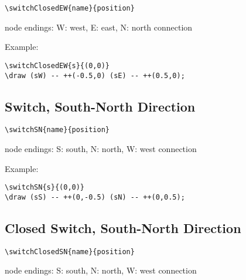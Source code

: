\documentclass[parskip=full]{scrartcl}
\begin{document}
\begin{verbatim}
\switchClosedEW{name}{position}
\end{verbatim}
node endings: W: west, E: east, N: north connection

Example:\\
\begin{minipage}{0.8\textwidth}
\begin{verbatim}
\switchClosedEW{s}{(0,0)}
\draw (sW) -- ++(-0.5,0) (sE) -- ++(0.5,0);
\end{verbatim}
\end{minipage}
\begin{minipage}{0.19\textwidth}
\end{minipage}

\subsection{Switch, South-North Direction}

\begin{verbatim}
\switchSN{name}{position}
\end{verbatim}
node endings: S: south, N: north, W: west connection

Example:\\
\begin{minipage}{0.8\textwidth}
\begin{verbatim}
\switchSN{s}{(0,0)}
\draw (sS) -- ++(0,-0.5) (sN) -- ++(0,0.5);
\end{verbatim}
\end{minipage}
\begin{minipage}{0.19\textwidth}
\end{minipage}

\subsection{Closed Switch, South-North Direction}

\begin{verbatim}
\switchClosedSN{name}{position}
\end{verbatim}
node endings: S: south, N: north, W: west connection
\end{document}
